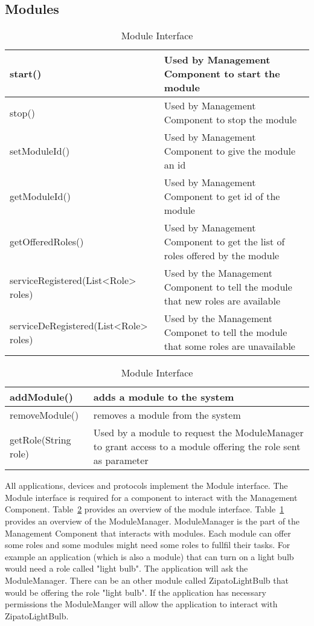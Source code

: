 \subsection{Modules}
\label{sec:modules}
\begin{table}
\begin{center}
\begin{tabular}{| l | p{5cm} |}
\hline
start() & Used by Management Component to start the module \\ \hline
stop() & Used by Management Component to stop the module \\ \hline
setModuleId() & Used by Management Component to give the module an id \\ \hline
getModuleId() & Used by Management Component to get id of the module \\ \hline
getOfferedRoles() & Used by Management Component to get the list of roles
offered by the module \\ \hline
serviceRegistered(List<Role> roles) & Used by the Management Component to tell
the module that new roles are available \\ \hline
serviceDeRegistered(List<Role> roles) & Used by the Management Componet to tell
the module that some roles are unavailable & \\ \hline
\end{tabular}
\end{center}
\caption{Module Interface}
\label{tab:modulemanager}
\end{table}
\begin{table}
\begin{center}
\begin{tabular}{| l | p{5cm} |}
\hline
addModule() & adds a module to the system \\ \hline
removeModule() & removes a module from the system \\ \hline
getRole(String role) & Used by a module to request the ModuleManager to grant
access to a module offering the role sent as parameter  \\ \hline
\end{tabular}
\end{center}
\caption{Module Interface}
\label{tab:module}
\end{table}
All applications, devices and protocols implement the Module interface. The
Module interface is required for a component to interact with the Management 
Component. Table~\ref{tab:module} provides an overview of the module interface.
Table~\ref{tab:modulemanager} provides an overview of the ModuleManager.
ModuleManager is the part of the Management Component that interacts with
modules. Each module can offer some roles and some modules might need some
roles to fullfil their tasks. For example an application (which is also a
module) that can turn on a light bulb would need a role called "light bulb".
The application will ask the ModuleManager. There can be an other module called
ZipatoLightBulb that would be offering the role "light bulb". If the
application has necessary permissions the ModuleManger will allow the
application to interact with ZipatoLightBulb.
